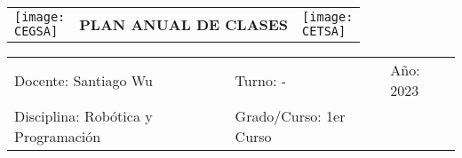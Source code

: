 \documentclass[landscape, a4paper, 10pt]{article}
\newcommand{\profesor}{Santiago Wu}
\newcommand{\discipline}{Robótica y Programación}
\newcommand{\currentyear}{2023}
\newcommand{\CEGSA}{cegsa-logo.png}
\newcommand{\CETSA}{cetsa-logo.png}
\begin{document}
	\pagebreak[4]
	\begin{tabularx}{\textwidth}{ >{\raggedright\arraybackslash}X >{\centering\arraybackslash}X >{\raggedleft\arraybackslash}X }
		\texttt{[image: \\CEGSA]} &
		\textbf{PLAN ANUAL DE CLASES} &
		\texttt{[image: \\CETSA]}
	\end{tabularx}
	\begin{tabularx}{\textwidth}{ >{\raggedright\arraybackslash}X >{\raggedright\arraybackslash}X >{\raggedright\arraybackslash}X }
		Docente: \profesor &
		Turno: - &
		Año: \currentyear \\
		Disciplina: \discipline &
		Grado/Curso: 1er Curso &
		 \\
	\end{tabularx}
	\centering
\end{document}
